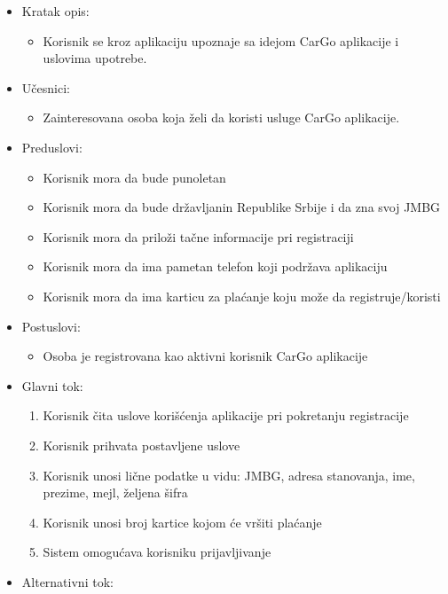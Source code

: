 \begin{itemize}
    \item Kratak opis:
        \begin{itemize}
            \item Korisnik se kroz aplikaciju upoznaje sa idejom CarGo aplikacije i uslovima upotrebe.
        \end{itemize}
    \item Učesnici:
        \begin{itemize}
            \item Zainteresovana osoba koja želi da koristi usluge CarGo aplikacije.
        \end{itemize}
    \item Preduslovi:
        \begin{itemize}
            \item Korisnik mora da bude punoletan
            \item Korisnik mora da bude državljanin Republike Srbije i da zna svoj JMBG
            \item Korisnik mora da priloži tačne informacije pri registraciji
            \item Korisnik mora da ima pametan telefon koji podržava aplikaciju
            \item Korisnik mora da ima karticu za plaćanje koju može da registruje/koristi
        \end{itemize}
    \item Postuslovi:
        \begin{itemize}
            \item Osoba je registrovana kao aktivni korisnik CarGo aplikacije
        \end{itemize}
    \item Glavni tok:
        \begin{enumerate}
            \item Korisnik čita uslove korišćenja aplikacije pri pokretanju registracije
            \item Korisnik prihvata postavljene uslove
            \item Korisnik unosi lične podatke u vidu: JMBG, adresa stanovanja, ime, prezime, mejl, željena šifra
            \item Korisnik unosi broj kartice kojom će vršiti plaćanje
            \item Sistem omogućava korisniku prijavljivanje
        \end{enumerate}
    \item Alternativni tok:

\end{itemize}
